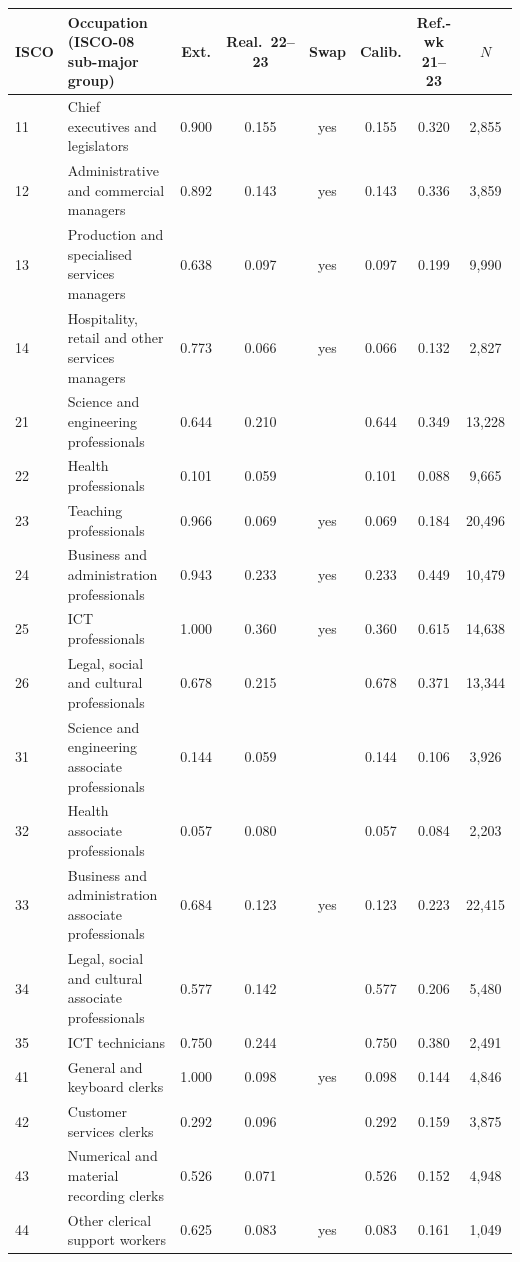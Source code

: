 \begin{tabular}{lp{5.2cm}cccccc}
\toprule
ISCO & Occupation (ISCO-08 sub-major group) & Ext. & Real.\ 22--23 & Swap & Calib. & Ref.-wk 21--23 & $N$ \\
\midrule
11 & Chief executives and legislators & 0.900 & 0.155 & yes & 0.155 & 0.320 & 2{,}855 \\
12 & Administrative and commercial managers & 0.892 & 0.143 & yes & 0.143 & 0.336 & 3{,}859 \\
13 & Production and specialised services managers & 0.638 & 0.097 & yes & 0.097 & 0.199 & 9{,}990 \\
14 & Hospitality, retail and other services managers & 0.773 & 0.066 & yes & 0.066 & 0.132 & 2{,}827 \\
21 & Science and engineering professionals & 0.644 & 0.210 &  & 0.644 & 0.349 & 13{,}228 \\
22 & Health professionals & 0.101 & 0.059 &  & 0.101 & 0.088 & 9{,}665 \\
23 & Teaching professionals & 0.966 & 0.069 & yes & 0.069 & 0.184 & 20{,}496 \\
24 & Business and administration professionals & 0.943 & 0.233 & yes & 0.233 & 0.449 & 10{,}479 \\
25 & ICT professionals & 1.000 & 0.360 & yes & 0.360 & 0.615 & 14{,}638 \\
26 & Legal, social and cultural professionals & 0.678 & 0.215 &  & 0.678 & 0.371 & 13{,}344 \\
31 & Science and engineering associate professionals & 0.144 & 0.059 &  & 0.144 & 0.106 & 3{,}926 \\
32 & Health associate professionals & 0.057 & 0.080 &  & 0.057 & 0.084 & 2{,}203 \\
33 & Business and administration associate professionals & 0.684 & 0.123 & yes & 0.123 & 0.223 & 22{,}415 \\
34 & Legal, social and cultural associate professionals & 0.577 & 0.142 &  & 0.577 & 0.206 & 5{,}480 \\
35 & ICT technicians & 0.750 & 0.244 &  & 0.750 & 0.380 & 2{,}491 \\
41 & General and keyboard clerks & 1.000 & 0.098 & yes & 0.098 & 0.144 & 4{,}846 \\
42 & Customer services clerks & 0.292 & 0.096 &  & 0.292 & 0.159 & 3{,}875 \\
43 & Numerical and material recording clerks & 0.526 & 0.071 &  & 0.526 & 0.152 & 4{,}948 \\
44 & Other clerical support workers & 0.625 & 0.083 & yes & 0.083 & 0.161 & 1{,}049 \\

\end{tabular}
